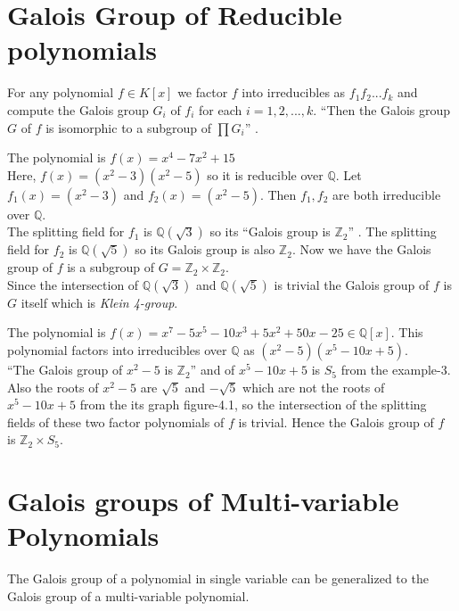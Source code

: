 \vspace{5mm}
\section{Galois Group of Reducible polynomials}
For any polynomial \(f \in K[x]\) we factor \(f\) into irreducibles as \(f_1f_2...f_k\) and compute the Galois group \(G_i\)  of \(f_i\) for each \(i=1,2,...,k\). ``Then the Galois group \(G\) of \(f\) is isomorphic to a subgroup of \(\prod G_i\)'' \cite{algorithm}.\\

\begin{example}
  The polynomial is \(f(x) = x^4-7x^2+15\)\\
  Here, \(f(x)=(x^2-3)(x^2-5)\) so it is reducible over \(\mathbb{Q}\). Let \(f_1(x)=(x^2-3)\) and \(f_2(x)=(x^2-5)\). Then \(f_1,f_2\) are both irreducible over \(\mathbb{Q}\).\\

  The splitting field for \(f_1\) is \(\mathbb{Q}(\sqrt{3})\) so its ``Galois group is \({\mathbb{Z}}_2\)'' \cite{hunger}. The splitting field for \(f_2\) is \(\mathbb{Q}(\sqrt{5})\) so its Galois group is also \({\mathbb{Z}}_2\). Now we have the Galois group of \(f\) is a subgroup of \(G={\mathbb{Z}}_2 \times {\mathbb{Z}}_2\). \\

  Since the intersection of \(\mathbb{Q}(\sqrt{3})\) and \(\mathbb{Q}(\sqrt{5})\) is trivial the Galois group of \(f\) is \(G\) itself which is \textit{Klein 4-group}.
\end{example}

\begin{example}
  The polynomial is \(f(x)=x^7-5x^5-10x^3+5x^2+50x-25 \in \mathbb{Q}[x]\). This polynomial factors into irreducibles over \(\mathbb{Q}\) as \((x^2-5)(x^5-10x+5)\).\\
  ``The Galois group of \(x^2-5\) is \({\mathbb{Z}}_2\)'' \cite{algorithm} and of \(x^5-10x+5\) is \(S_5\) from the example-3. Also the roots of \(x^2-5\) are \(\sqrt{5}\) and \(-\sqrt{5}\) which are not the roots of \(x^5-10x+5\) from the its graph figure-4.1, so the intersection of the splitting fields of these two factor polynomials of \(f\) is trivial. Hence the Galois group of \(f\) is \(\mathbb{Z}_2 \times S_5\).
\end{example}

\vspace{7mm}
\section{Galois groups of Multi-variable Polynomials}
The Galois group of a polynomial in single variable can be generalized to the Galois group of a multi-variable polynomial.
\vspace{3mm}

